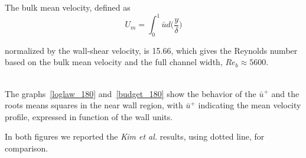 The bulk mean velocity, defined as 
\begin{equation*}
U_{m} = \int_{0}^{1} \bar{u}d \big(\frac{y}{\delta} \big)
\end{equation*}

normalized by the wall-shear velocity, is 15.66, which gives the Reynolds number based on the bulk mean velocity and the full channel width, $Re_{b}\approx 5600$. \\~\par
The graphs~\ref{loglaw_180} and~\ref{budget_180} show the behavior of the $\bar{u}^{+}$ and the roots means squares in the near wall region, with $\bar{u}^{+}$ indicating the mean velocity profile, expressed in function of the wall units. \par
In both figures we reported the \emph{Kim et al.} results, using dotted line, for comparison. \\~\par

